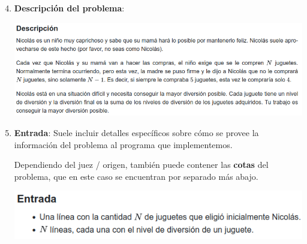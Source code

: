 \documentclass{beamer}
\begin{document}
    \begin{frame}[noframenumbering]
        \begin{enumerate}
            \setcounter{enumi}{3}
            \item \textbf{Descripción del problema}: \pause

            \begin{center}
                \includegraphics[width=.8\linewidth]{./ou_description.png}
            \end{center} \pause

        \item \textbf{Entrada}: \pause Suele incluir detalles específicos sobre cómo se provee la información del problema al programa que implementemos. \pause

            Dependiendo del juez / origen, también puede contener las \textbf{cotas} del problema, que en este caso se encuentran por separado más abajo. \pause

            \begin{center}
                \includegraphics[width=.8\linewidth]{./ou_input.png}
            \end{center}
        \end{enumerate}
    \end{frame}
\end{document}
